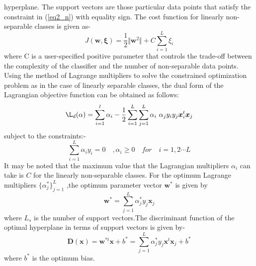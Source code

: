 hyperplane. The support vectors are those particular data points that satisfy the constraint in (\ref{eq2_n}) with equality sign. The cost function for linearly non-separable classes is given as-
\begin{equation}
J (\boldsymbol{w},\boldsymbol{\xi})=\frac{1}{2} \Vert \boldsymbol{w}^2 \Vert +C \sum_{i=1}^L\xi_i
 \end{equation}
where C is a user-specified positive parameter that controls the trade-off between the complexity of the classifier and the number of non-separable data points. Using the method of Lagrange multipliers to solve the constrained optimization problem as in the case of linearly separable classes, the dual form of the Lagrangian objective function can be
obtained as follows:
\begin{equation}\label{Dual_n}
\L_d(\alpha) =  \sum_{i=1}^l\alpha_i - \frac{1}{2}\sum_{i=1}^L \sum_{j=1}^L\alpha_i\ \alpha_j y_i y_j \boldsymbol{x}_i^t \boldsymbol{x}_j
\end{equation}
subject to the constraints:-
\begin{equation}
\sum_{i=1}^L \alpha_i y_i =0 \quad ,\alpha_i \geq 0 \quad for \quad i=1,2 \cdots L 
\end{equation}
It may be noted that the maximum value that the Lagrangian multipliers $\alpha_i$  can take is $C$ for the linearly non-separable classes. For the optimum Lagrange multipliers
$\lbrace\alpha^*_j\rbrace_{j=1}^L$ ,the optimum parameter vector $\boldsymbol{w^*}$ is given by 
\begin{equation}
\boldsymbol{w^*}=\sum_{j=1}^L \alpha_j^* y_j \boldsymbol{x}_j
\end{equation}
where $L_s$ is the number of support vectors.The discriminant function of the optimal hyperplane in terms of support vectors is given by-
\begin{equation}\label{SVK_n}
\boldsymbol{D}(\boldsymbol{x})=\boldsymbol{w}^{*t}\boldsymbol{x}+b^* =\sum_{j=1}^L \alpha^*_j y_j \boldsymbol{x}^t \boldsymbol{x}_j + b^*
\end{equation}
where $b^*$  is the optimum bias.

